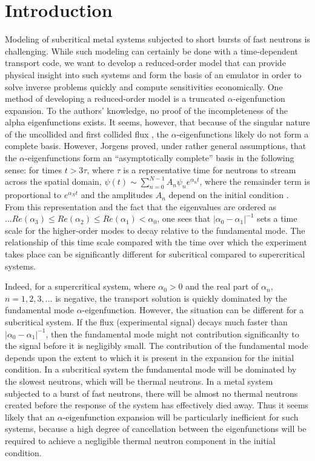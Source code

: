 \documentclass{style/nseJournal}
\begin{document}
\section{Introduction}
Modeling of subcritical metal systems subjected to short bursts of fast neutrons is challenging.  
While such modeling can certainly be done with a time-dependent transport code, we want to develop a reduced-order model that can provide physical insight into such systems and form the basis of an emulator in order to solve inverse problems quickly and compute sensitivities economically.  
One method of developing a reduced-order model is a truncated $\alpha$-eigenfunction expansion.  
To the authors' knowledge, no proof of the incompleteness of the alpha eigenfunctions exists.  
It seems, however, that because of the singular nature of the uncollided and first collided flux \cite{bondarenko1998structure} \cite{larsen1975solutions}, the $\alpha$-eigenfunctions likely do not form a complete basis.  
However, Jorgens proved, under rather general assumptions, that the $\alpha$-eigenfunctions form an ``asymptotically complete'' basis in the following sense: for times $t>3\tau$, where $\tau$ is a representative time for neutrons to stream across the spatial domain, $\psi\left(t\right) \sim \sum_{n=0}^{N-1} A_n \psi_n e^{\alpha_n t}$, where the remainder term is proportional to $e^{\alpha_N t}$ and the amplitudes $A_n$ depend on the initial condition \cite{jorgens1958asymptotic}.  
From this representation and the fact that the eigenvalues are ordered as $...Re\left(\alpha_3\right)\le Re\left(\alpha_2\right)\le  Re\left(\alpha_1\right) < \alpha_0$, one sees that $|\alpha_0 - \alpha_1|^{-1}$ sets a time scale for the higher-order modes to decay relative to the fundamental mode.  
The relationship of this time scale compared with the time over which the experiment takes place can be significantly different for subcritical compared to supercritical systems.  

Indeed, for a supercritical system, where $\alpha_0 > 0$ and the real part of $\alpha_n$, $n=1,2,3,...$ is negative, the transport solution is quickly dominated by the fundamental mode $\alpha$-eigenfunction.  
However, the situation can be different for a subcritical system.  
If the flux (experimental signal) decays much faster than $|\alpha_0 - \alpha_1|^{-1}$, then the fundamental mode might not contribution significanlty to the signal before it is negligibly small.  
The contribution of the fundamental mode depends upon the extent to which it is present in the expansion for the initial condition.  
In a subcritical system the fundamental mode will be dominated by the slowest neutrons, which will be thermal neutrons.  
In a metal system subjected to a burst of fast neutrons, there will be almost no thermal neutrons created before the response of the system has effectively died away.  
Thus it seems likely that an $\alpha$-eigenfunction expansion will be particularly inefficient for such systems, because a high degree of cancellation between the eigenfunctions will be required to achieve a negligible thermal neutron component in the initial condition.  
\end{document}
